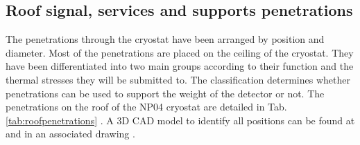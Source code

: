 \subsection{Roof signal, services and supports penetrations}

The penetrations through the cryostat have been arranged by position and diameter. %
Most of the penetrations are placed on the ceiling of the cryostat. They have been differentiated into two main groups according to their function and the thermal stresses they will be submitted to. The classification determines whether penetrations can be used to support the weight of the detector or not.
The penetrations on the roof of the NP04 cryostat are detailed in Tab. \ref{tab:roofpenetrations} .  
A 3D CAD model to identify all positions can be found at \cite{edms4} and in an associated drawing \cite{edms5}.


